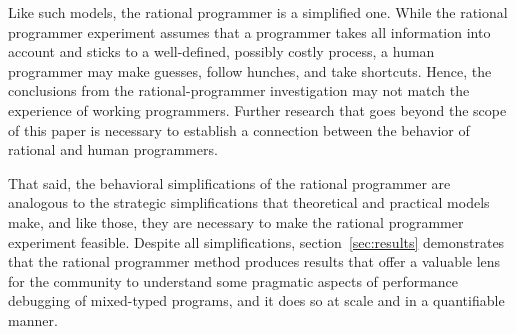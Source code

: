 Like such models, the rational programmer is a simplified one.  While the
rational programmer experiment assumes that a programmer takes all
information into account and sticks to a well-defined, possibly costly
process, a human programmer may make guesses, follow hunches, and take
shortcuts. Hence, the conclusions from the rational-programmer
investigation may not match the experience of working programmers. Further
research that goes beyond the scope of this paper is necessary to
establish a connection between the behavior of rational and human
programmers.  

That said, the behavioral simplifications of the rational programmer are
analogous to the strategic simplifications that theoretical and practical models
make, and like those, they are necessary to make the rational programmer
experiment feasible. Despite all simplifications, section~\ref{sec:results}
demonstrates that the rational programmer method produces results that offer a
valuable lens for the community to understand some pragmatic aspects of
performance debugging of mixed-typed programs, and it does so at scale and in a
quantifiable manner.
